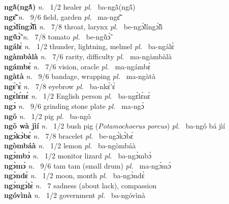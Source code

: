 \noindent
{\bfseries ngã̀(ngã̀́)}  {\itshape n.~} 1/2 healer {\itshape pl.~} ba-ngã̀(ngã́)    \\ 
{\bfseries ngɛ̃̂}  {\itshape n.~} 9/6 field, garden {\itshape pl.~} ma-ngɛ̃̂    \\ 
{\bfseries ngɔ̃̀língɔ̃̂́lì}  {\itshape n.~} 7/8 throat, larynx {\itshape pl.~} be-ngɔ̃̀língɔ̃́lì    \\ 
{\bfseries ngũ̀ɔ̃̀}  {\itshape n.~} 7/8 tomato {\itshape pl.~} be-ngũ̀ɔ̃̀    \\ 
{\bfseries ngálɛ̀}  {\itshape n.~} 1/2 thunder, lightning, melmel {\itshape pl.~} ba-ngálɛ̀    \\ 
{\bfseries  ngàmbàlà}  {\itshape n.~} 7/6 rarity, difficulty {\itshape pl.~} ma-ngàmbàlà    \\ 
{\bfseries ngámbɛ́}  {\itshape n.~} 7/6 vision, oracle {\itshape pl.~} ma-ngámbɛ̀    \\ 
{\bfseries ngàtà}  {\itshape n.~} 9/6 bandage, wrapping  {\itshape pl.~} ma-ngàtà    \\ 
{\bfseries ngɛ̀'ɛ̀}  {\itshape n.~} 7/8 eyebrow {\itshape pl.~} ba-nkɛ̀'ɛ̀    \\ 
{\bfseries ngɛ̀lɛ́nɛ̀}  {\itshape n.~} 1/2 English person {\itshape pl.~} ba-ngɛ̀lɛ́nɛ̀    \\ 
{\bfseries ngɔ̀}  {\itshape n.~} 9/6 grinding stone plate {\itshape pl.~} ma-ngɔ̀    \\ 
{\bfseries ngǒ}  {\itshape n.~} 1/2 pig {\itshape pl.~} ba-ngǒ    \\ 
{\bfseries ngǒ wà jìí}  {\itshape n.~} 1/2 bush pig ({\itshape Potamochoerus porcus}) {\itshape pl.~} ba-ngǒ bá jìí    \\ 
{\bfseries ngɔ́kɔ̀bɛ́}  {\itshape n.~} 7/8 bracelet {\itshape pl.~} be-ngɔ́kɔ̀bɛ́    \\ 
{\bfseries ngòmbáà}  {\itshape n.~} 1/2 lemon {\itshape pl.~} ba-ngòmbáà    \\ 
{\bfseries ngɔ̀mbɔ̀}  {\itshape n.~} 1/2 monitor lizard {\itshape pl.~} ba-ngɔ̀mbɔ̀    \\ 
{\bfseries ngɔ̀mɔ̀}  {\itshape n.~} 9/6 tam tam (small drum) {\itshape pl.~} ma-ngɔ̀mɔ̀    \\ 
{\bfseries ngɔ̀ndɛ̀}  {\itshape n.~} 1/2 moon, month {\itshape pl.~} ba-ngɔ̀ndɛ̀    \\ 
{\bfseries ngɔ̀ngɔ̀lɛ̀}  {\itshape n.~} 7 sadness (about lack), compassion    \\ 
{\bfseries ngóvìnà}  {\itshape n.~} 1/2 government {\itshape pl.~} ba-ngóvìnà    \\ 
